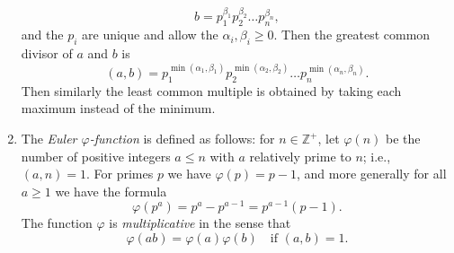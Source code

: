 \begin{enumerate}[(1)]
\[        b=p_1^{\beta_1}p_2^{\beta_2}\dots p_n^{\beta_n},
    \]
    and the $p_i$ are unique and allow the $\alpha_i,\beta_i\ge0$.
    Then the greatest common divisor of $a$ and $b$ is 
    \[
        (a,b)=p_1^{\min(\alpha_1,\beta_1)}p_2^{\min(\alpha_2,\beta_2)}\dots p_n^{\min(\alpha_n,\beta_n)}.
    \]
    Then similarly the least common multiple is obtained by taking each maximum instead of the minimum.
    \item The \textit{Euler $\varphi$-function} is defined as follows:
    for $n\in\mathbb{Z}^+$, let $\varphi(n)$ be the number of positive integers $a\le n$ with $a$ relatively prime to $n$; i.e., $(a,n)=1$.
    For primes $p$ we have $\varphi(p)=p-1$, and more generally for all $a\ge1$ we have the formula
    \[
        \varphi(p^a)=p^a-p^{a-1}=p^{a-1}(p-1).
    \]
    The function $\varphi$ is \textit{multiplicative} in the sense that
    \[
        \varphi(ab)=\varphi(a)\varphi(b)\quad\text{if }(a,b)=1.
    \]
\end{enumerate}
